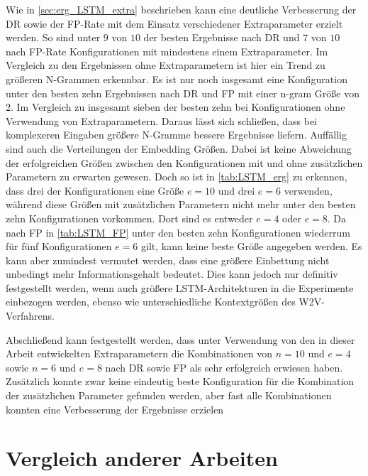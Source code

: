 Wie in \autoref{sec:erg_LSTM_extra} beschrieben kann eine deutliche Verbesserung der \ac{DR} sowie  der \ac{FP}-Rate mit dem Einsatz verschiedener Extraparameter erzielt werden.
So sind unter $9$ von $10$ der besten Ergebnisse nach \ac{DR} und $7$ von $10$ nach \ac{FP}-Rate Konfigurationen mit mindestens einem Extraparameter.
Im Vergleich zu den Ergebnissen ohne Extraparametern ist hier ein Trend zu größeren N-Grammen erkennbar.
Es ist nur noch insgesamt eine Konfiguration unter den besten zehn Ergebnissen nach \ac{DR} und \ac{FP} mit einer n-gram Größe von $2$.
Im Vergleich zu insgesamt sieben  der besten zehn bei Konfigurationen ohne Verwendung von Extraparametern.
Daraus lässt sich schließen, dass bei komplexeren Eingaben größere N-Gramme bessere Ergebnisse liefern. 
Auffällig sind auch die Verteilungen der Embedding Größen.
Dabei ist keine Abweichung der erfolgreichen Größen zwischen den Konfigurationen mit und ohne zusätzlichen Parametern zu erwarten gewesen.
Doch so ist in \autoref{tab:LSTM_erg} zu erkennen, dass drei der Konfigurationen eine Größe $e=10$ und drei $e=6$ verwenden, während diese Größen mit zusätzlichen Parametern nicht mehr unter den besten zehn Konfigurationen vorkommen.
Dort sind es entweder $e=4$ oder $e=8$.
Da nach \ac{FP} in \autoref{tab:LSTM_FP} unter den besten zehn Konfigurationen wiederrum für fünf Konfigurationen $e=6$ gilt, kann keine beste Größe angegeben werden.
Es kann aber zumindest vermutet werden, dass eine größere Einbettung nicht unbedingt mehr Informationsgehalt bedeutet.
Dies kann jedoch nur definitiv festgestellt werden, wenn auch größere \ac{LSTM}-Architekturen in die Experimente einbezogen werden, ebenso wie unterschiedliche Kontextgrößen des \ac{W2V}-Verfahrens.

Abschließend kann festgestellt werden, dass unter Verwendung von den in dieser Arbeit entwickelten Extraparametern die Kombinationen von $n=10$ und $e=4$ sowie $n=6$ und $e=8$ nach \ac{DR} sowie \ac{FP} als sehr erfolgreich erwiesen haben.
Zusätzlich konnte zwar keine eindeutig beste Konfiguration für die Kombination der zusätzlichen Parameter gefunden werden, aber fast alle Kombinationen konnten eine Verbesserung der Ergebnisse erzielen

\section{Vergleich anderer Arbeiten}\label{sec:folgerungen_vgl}

